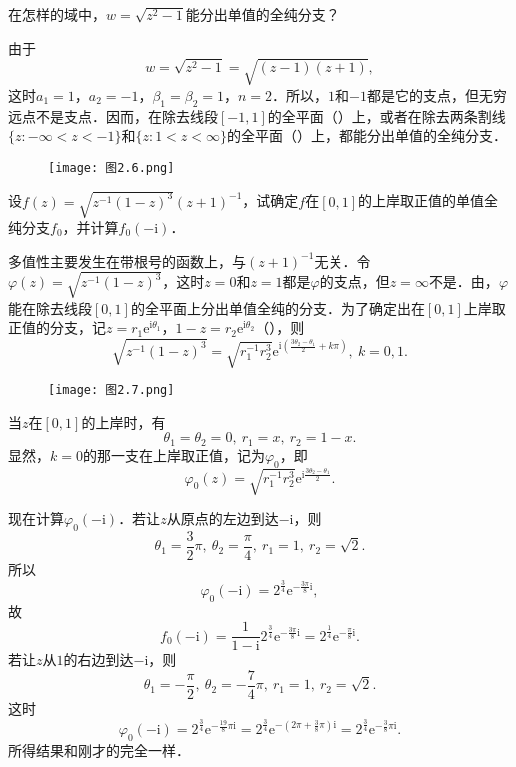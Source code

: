 \documentclass[../../main.tex]{subfiles}
\begin{document}
\begin{example}
在怎样的域中，$w = \sqrt{z^2 - 1}$能分出单值的全纯分支？
\end{example}
\begin{solution}
由于
\[
w = \sqrt{z^2 - 1} = \sqrt{(z - 1)(z + 1)},
\]
这时$a_1 = 1$，$a_2 = -1$，$\beta_1 = \beta_2 = 1$，$n = 2$．所以，$1$和$-1$都是它的支点，但无穷远点不是支点．因而，在除去线段$[-1,1]$的全平面（）上，或者在除去两条割线$\{ z: -\infty < z < -1 \}$和$\{ z: 1 < z < \infty \}$的全平面（）上，都能分出单值的全纯分支．

\begin{figure}[H]
\centering
\texttt{[image: 图2.6.png]}
\caption{}
\label{figure:图2.6}
\end{figure}


\end{solution}

\begin{example}
设$f(z) = \sqrt{z^{-1}(1 - z)^3} (z + 1)^{-1}$，试确定$f$在$[0,1]$的上岸取正值的单值全纯分支$f_0$，并计算$f_0(-\text{i})$．
\end{example}
\begin{solution}
多值性主要发生在带根号的函数上，与$(z + 1)^{-1}$无关．令$\varphi(z) = \sqrt{z^{-1}(1 - z)^3}$，这时$z = 0$和$z = 1$都是$\varphi$的支点，但$z = \infty$不是．由，$\varphi$能在除去线段$[0,1]$的全平面上分出单值全纯的分支．为了确定出在$[0,1]$上岸取正值的分支，记$z = r_1 \text{e}^{\text{i}\theta_1}$，$1 - z = r_2 \text{e}^{\text{i}\theta_2}$（），则
\[
\sqrt{z^{-1}(1 - z)^3} = \sqrt{r_1^{-1} r_2^3} \text{e}^{\text{i}\left( \frac{3\theta_2 - \theta_1}{2} + k\pi \right)}, \ k = 0,1.
\]

\begin{figure}[H]
\centering
\texttt{[image: 图2.7.png]}
\caption{}
\label{figure:图2.7}
\end{figure}

当$z$在$[0,1]$的上岸时，有
\[
\theta_1 = \theta_2 = 0, \ r_1 = x, \ r_2 = 1 - x.
\]
显然，$k = 0$的那一支在上岸取正值，记为$\varphi_0$，即
\[
\varphi_0(z) = \sqrt{r_1^{-1} r_2^3} \text{e}^{\text{i}\frac{3\theta_2 - \theta_1}{2}}.
\]

现在计算$\varphi_0(-\text{i})$．若让$z$从原点的左边到达$-\text{i}$，则
\[
\theta_1 = \dfrac{3}{2}\pi, \ \theta_2 = \dfrac{\pi}{4}, \ r_1 = 1, \ r_2 = \sqrt{2}.
\]
所以
\[
\varphi_0(-\text{i}) = 2^{\frac{3}{4}} \text{e}^{-\frac{3\pi}{8} \text{i}},
\]
故
\[
f_0(-\text{i}) = \dfrac{1}{1 - \text{i}} 2^{\frac{3}{4}} \text{e}^{-\frac{3\pi}{8} \text{i}}
= 2^{\frac{1}{4}} \text{e}^{-\frac{\pi}{8} \text{i}}.
\]
若让$z$从$1$的右边到达$-\text{i}$，则
\[
\theta_1 = -\dfrac{\pi}{2}, \ \theta_2 = -\dfrac{7}{4}\pi, \ r_1 = 1, \ r_2 = \sqrt{2}.
\]
这时
\[
\varphi_0(-\text{i}) = 2^{\frac{3}{4}} \text{e}^{-\frac{19}{8}\pi \text{i}}
= 2^{\frac{3}{4}} \text{e}^{-\left( 2\pi + \frac{3}{8}\pi \right) \text{i}}
= 2^{\frac{3}{4}} \text{e}^{-\frac{3}{8}\pi \text{i}}.
\]
所得结果和刚才的完全一样．

\end{solution}
\end{document}
